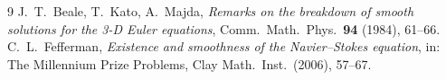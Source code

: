 \begin{thebibliography}{9}
 J.~T.~Beale, T.~Kato, A.~Majda, \emph{Remarks on the breakdown of smooth solutions for the 3-D Euler equations}, Comm.\ Math.\ Phys.\ \textbf{94} (1984), 61--66.
 C.~L.~Fefferman, \emph{Existence and smoothness of the Navier--Stokes equation}, in: The Millennium Prize Problems, Clay Math.\ Inst.\ (2006), 57--67.
\end{thebibliography}

